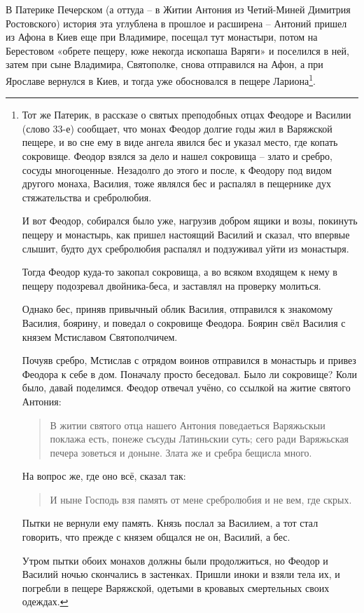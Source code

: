 В Патерике Печерском (а оттуда – в Житии Антония из Четий-Миней Димитрия Ростовского) история эта углублена в прошлое и расширена – Антоний пришел из Афона в Киев еще при Владимире, посещал тут монастыри, потом на Берестовом «обрете пещеру, юже некогда ископаша Варяги» и поселился в ней, затем при сыне Владимира, Святополке, снова отправился на Афон, а при Ярославе вернулся в Киев, и тогда уже обосновался в пещере Лариона\footnote{Тот же Патерик, в рассказе о святых преподобных отцах Феодоре и Василии (слово 33-е) сообщает, что монах Феодор долгие годы жил в Варяжской пещере, и во сне ему в виде ангела явился бес и указал место, где копать сокровище. Феодор взялся за дело и нашел сокровища – злато и сребро, сосуды многоценные. Незадолго до этого и после, к Феодору под видом другого монаха, Василия, тоже являлся бес и распалял в пещернике дух стяжательства и сребролюбия. 

И вот Феодор, собирался было уже, нагрузив добром ящики и возы, покинуть пещеру и монастырь, как пришел настоящий Василий и сказал, что впервые слышит, будто дух сребролюбия распалял и подзуживал уйти из монастыря.

Тогда Феодор куда-то закопал сокровища, а во всяком входящем к нему в пещеру подозревал двойника-беса, и заставлял на проверку молиться.

Однако бес, приняв привычный облик Василия, отправился к знакомому Василия, боярину, и поведал о сокровище Феодора. Боярин свёл Василия с князем Мстиславом Святополчичем.

Почуяв сребро, Мстислав с отрядом воинов отправился в монастырь и привез Феодора к себе в дом. Поначалу просто беседовал. Было ли сокровище? Коли было, давай поделимся. Феодор отвечал учёно, со ссылкой на житие святого Антония:

\begin{quotation}
В житии святого отца нашего Антония поведаеться Варяжьскыи поклажа есть, понеже съсуды Латиньскии суть; сего ради Варяжьская печера зоветься и доныне. Злата же и сребра бещисла много.
\end{quotation}

На вопрос же, где оно всё, сказал так:

\begin{quotation}
И ныне Господь взя память от мене сребролюбия и не вем, где скрых.
\end{quotation}

Пытки не вернули ему память. Князь послал за Василием, а тот стал говорить, что прежде с князем общался не он, Василий, а бес. 

Утром пытки обоих монахов должны были продолжиться, но Феодор и Василий ночью скончались в застенках. Пришли иноки и взяли тела их, и погребли в пещере Варяжской, одетыми в кровавых смертельных своих одеждах.}.

